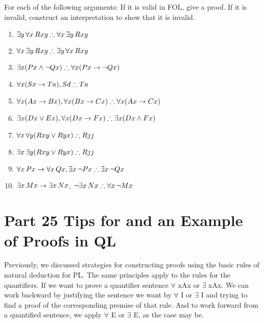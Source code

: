 \problempart
\label{pr.FOLvalidornot}
For each of the following arguments: If it is valid in FOL, give a proof. If it is invalid, construct an interpretation to show that it is invalid.
\begin{enumerate}
\item $\exists y\,\forall x\,\atom{R}{xy} \therefore \forall x\,\exists y\,\atom{R}{xy}$
\item $\forall x\,\exists y\,\atom{R}{xy} \therefore  \exists y\,\forall x\,\atom{R}{xy}$
\item $\exists x(\atom{P}{x} \eand \enot \atom{Q}{x}) \therefore \forall x(\atom{P}{x} \eif \enot \atom{Q}{x})$
\item $\forall x(\atom{S}{x} \eif \atom{T}{a}), \atom{S}{d} \therefore \atom{T}{a}$
\item $\forall x(\atom{A}{x}\eif \atom{B}{x}), \forall x(\atom{B}{x} \eif \atom{C}{x}) \therefore \forall x(\atom{A}{x} \eif \atom{C}{x})$
\item $\exists x(\atom{D}{x} \eor \atom{E}{x}), \forall x(\atom{D}{x} \eif \atom{F}{x}) \therefore \exists x(\atom{D}{x} \eand \atom{F}{x})$
\item $\forall x\,\forall y(\atom{R}{xy} \eor \atom{R}{yx}) \therefore \atom{R}{jj}$
\item $\exists x\,\exists y(\atom{R}{xy} \eor \atom{R}{yx}) \therefore \atom{R}{jj}$
\item $\forall x\,\atom{P}{x} \eif \forall x\,\atom{Q}{x}, \exists x\, \enot\atom{P}{x} \therefore \exists x\, \enot \atom{Q}{x}$
\item $\exists x\,\mathord{M}x \rightarrow \exists x\,\mathord{N}x$, $\enot \exists x\,\atom{N}{x}\therefore  \forall x\, \enot \atom{M}{x}$
\end{enumerate}




\chapter{Part 25 Tips for and an Example of Proofs in QL}

Previously, we discussed strategies for constructing proofs using the basic rules of natural deduction for PL. The same principles apply to the rules for the quantifiers. If we want to prove a quantifier sentence $\forall$ xAx or $\exists$ xAx. We can work backward by justifying the sentence we want by $\forall$ I or $\exists$ I and trying to find a proof of the corresponding premise of that rule. And to work forward from a quantified sentence, we apply $\forall$ E or $\exists$ E, as the case may be.

